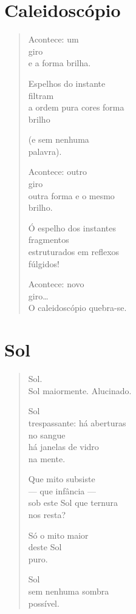 \chapter{Caleidoscópio}

\begin{verse}
Acontece: um\\
\quad{}giro\\
\quad{}e a forma brilha.

Espelhos do instante\\
\quad{}filtram\\
a ordem pura cores forma\\
\quad{}brilho

(e sem nenhuma\\
\quad{}palavra).

Acontece: outro\\
\quad{}giro\\
\quad{}outra forma e o mesmo\\
\hfill{}brilho.

Ó espelho dos instantes\\
\hfill{}fragmentos\\
estruturados em reflexos\\
\hfill{}fúlgidos!

Acontece: novo\\
\hfill{}giro\ldots{}\\
O caleidoscópio quebra-se.
\end{verse}

\chapter{Sol}

\begin{verse}
Sol.\\
Sol maiormente. Alucinado.

Sol\\
trespassante: há aberturas\\
\quad\quad\quad{}no sangue\\
\quad\quad\quad{}há janelas de vidro\\
\quad\quad\quad{}na mente.

Que mito subsiste\\
---  que infância ---\\
sob este Sol que ternura\\
\quad\quad{}nos resta?

Só o mito maior\\
deste Sol\\
puro.

Sol\\
sem nenhuma sombra\\
\quad\quad{}possível.
\end{verse}

